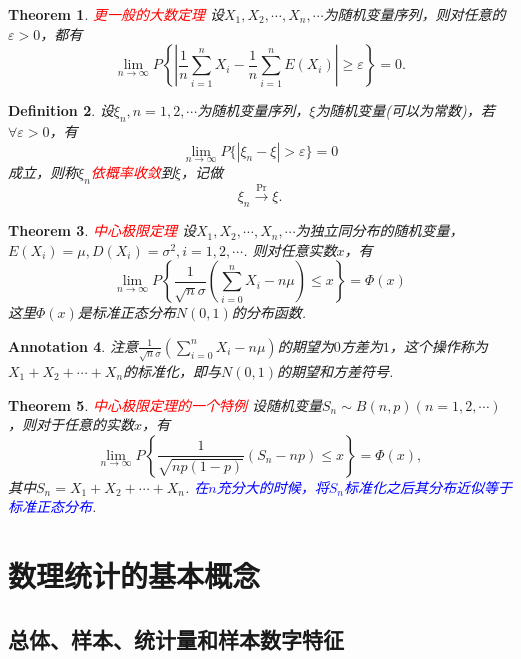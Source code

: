 \documentclass{article}
\newtheorem{theorem}{Theorem}[section]
\newtheorem{definition}[theorem]{Definition}
\newtheorem{annotation}[theorem]{Annotation}
\newcommand{\redt}[1]{\textcolor{red}{#1}}
\newcommand{\bluet}[1]{\textcolor{blue}{#1}}
\begin{document}
\begin{theorem}
\rm \redt{更一般的大数定理} 设$X_1,X_2,\cdots,X_n,\cdots$为随机变量序列，则对任意的$\varepsilon > 0$，都有
$$
\lim\limits_{n \to \infty} P\left\{ \left| \frac{1}{n} \sum\limits_{i=1}^n X_i - \frac{1}{n} \sum\limits_{i=1}^n E(X_i) \right| \geq \varepsilon \right\} = 0. 
$$
\end{theorem}

\begin{definition}
\rm 设$\xi_n, n = 1,2,\cdots$为随机变量序列，$\xi$为随机变量(可以为常数)，若$\forall \varepsilon > 0$，有
$$
\lim\limits_{n \to \infty} P\{ |\xi_n -\xi| > \varepsilon \} = 0
$$
成立，则称$\xi_n$\redt{依概率收敛}到$\xi$，记做
$$
\xi_n \xrightarrow{\text{Pr}} \xi.
$$
\end{definition}


\begin{theorem}
\rm \redt{中心极限定理} 设$X_1,X_2,\cdots,X_n,\cdots$为独立同分布的随机变量，$E(X_i)=\mu,D(X_i)=\sigma^2,i=1,2,\cdots$. 则对任意实数$x$，有
$$
\lim\limits_{n \rightarrow \infty}P\left\{\frac{1}{\sqrt{n}\sigma}\left(\sum\limits_{i=0}^nX_i - n\mu \right) \leq x\right\} = \Phi(x)
$$
这里$\Phi(x)$是标准正态分布$N(0,1)$的分布函数. 
\end{theorem}



\begin{annotation}
\rm 注意$\frac{1}{\sqrt{n}\sigma}(\sum\limits_{i=0}^nX_i - n\mu)$的期望为$0$方差为$1$，这个操作称为$X_1 + X_2 +\cdots + X_n$的标准化，即与$N(0,1)$的期望和方差符号. 
\end{annotation}

\begin{theorem}
\rm \redt{中心极限定理的一个特例} 设随机变量$S_n \sim B(n,p)(n=1,2,\cdots)$，则对于任意的实数$x$，有
$$
\lim\limits_{n \rightarrow \infty}P\left\{\frac{1}{\sqrt{np(1-p)}}(S_n - np) \leq x\right\} = \Phi(x),
$$
其中$S_n = X_1+X_2+\cdots + X_n$. \bluet{在$n$充分大的时候，将$S_n$标准化之后其分布近似等于标准正态分布}. 
\end{theorem}


\newpage
\section{数理统计的基本概念}

\subsection{总体、样本、统计量和样本数字特征}
\end{document}
